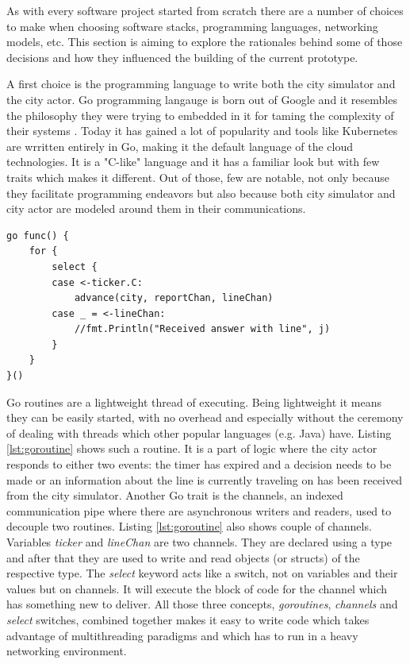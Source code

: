 \documentclass[conference]{IEEEtran}
\begin{document}
As with every software project started from scratch there are a number of choices to make when choosing software stacks, programming languages, networking models, etc. This section is aiming to explore the rationales behind some of those decisions and how they influenced the building of the current prototype.

A first choice is the programming language to write both the city simulator and the city actor. Go programming langauge is born out of Google and it resembles the philosophy they were trying to embedded in it for taming the complexity of their systems \citep{donovan2015go}. Today it has gained a lot of popularity and tools like Kubernetes are wrritten entirely in Go, making it the default language of the cloud technologies. It is a "C-like" language and it has a familiar look but with few traits which makes it different. Out of those, few are notable, not only because they facilitate programming endeavors but also because both city simulator and city actor are modeled around them in their communications. 

\begin{lstlisting}[caption=Go routine from city actor, label=lst:goroutine]
go func() {
	for {
		select {
		case <-ticker.C:
			advance(city, reportChan, lineChan)
		case _ = <-lineChan:
			//fmt.Println("Received answer with line", j)
		}
	}
}()
\end{lstlisting}

Go routines are a lightweight thread of executing. Being lightweight it means they can be easily started, with no overhead and especially without the ceremony of dealing with threads which other popular languages (e.g. Java) have. Listing \ref{lst:goroutine} shows such a routine. It is a part of logic where the city actor responds to either two events: the timer has expired and a decision needs to be made or an information about the line is currently traveling on has been received from the city simulator. Another Go trait is the channels, an indexed communication pipe where there are asynchronous writers and readers, used to decouple two routines. Listing \ref{lst:goroutine} also shows couple of channels. Variables \textit{ticker} and \textit{lineChan} are two channels. They are declared using a type and after that they are used to write and read objects (or structs) of the respective type. The \textit{select} keyword acts like a switch, not on variables and their values but on channels. It will execute the block of code for the channel which has something new to deliver. All those three concepts, \textit{goroutines}, \textit{channels} and \textit{select} switches, combined together makes it easy to write code which takes advantage of multithreading paradigms and which has to run in a heavy networking environment.
\end{document}

